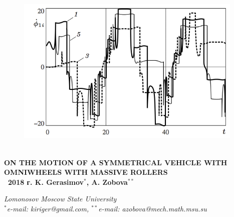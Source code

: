 \vspace{-135pt}
\vspace{135pt}

\begin{figure}[H]
  \hspace{-20pt}
  \includegraphics[width=0.97\textwidth]{pic/figure7_2.png}
  \caption{\ }
  \label{fig:wrench}
\end{figure}


%

%

%




% 
\newpage
\begin{center}
\large
\textbf{ ON THE MOTION OF A SYMMETRICAL VEHICLE WITH OMNIWHEELS WITH MASSIVE ROLLERS \\
\textcopyright \ 2018 г. \quad K. Gerasimov$^{*}$, A. Zobova$^{**}$ }

\textit{ Lomonosov Moscow State University \\
$^*$e-mail: kiriger@gmail.com, $^{**}$e-mail: azobova@mech.math.msu.su }
\end{center}




